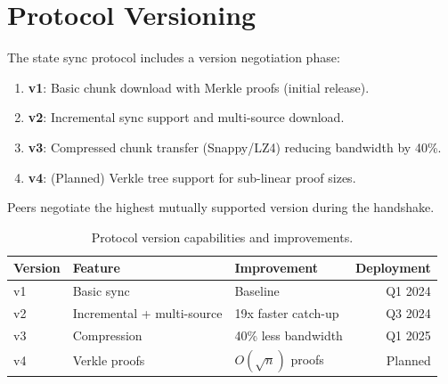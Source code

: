 \section{Protocol Versioning}
\label{sec:versioning}

The state sync protocol includes a version negotiation phase:

\begin{enumerate}
    \item \textbf{v1}: Basic chunk download with Merkle proofs (initial release).
    \item \textbf{v2}: Incremental sync support and multi-source download.
    \item \textbf{v3}: Compressed chunk transfer (Snappy/LZ4) reducing bandwidth by 40\%.
    \item \textbf{v4}: (Planned) Verkle tree support for sub-linear proof sizes.
\end{enumerate}

Peers negotiate the highest mutually supported version during the handshake.

\begin{table}[H]
\centering
\caption{Protocol version capabilities and improvements.}
\label{tab:versions}
\begin{tabular}{lllr}
\toprule
\textbf{Version} & \textbf{Feature} & \textbf{Improvement} & \textbf{Deployment} \\
\midrule
v1 & Basic sync & Baseline & Q1 2024 \\
v2 & Incremental + multi-source & 19x faster catch-up & Q3 2024 \\
v3 & Compression & 40\% less bandwidth & Q1 2025 \\
v4 & Verkle proofs & $O(\sqrt{n})$ proofs & Planned \\
\bottomrule
\end{tabular}
\end{table}

